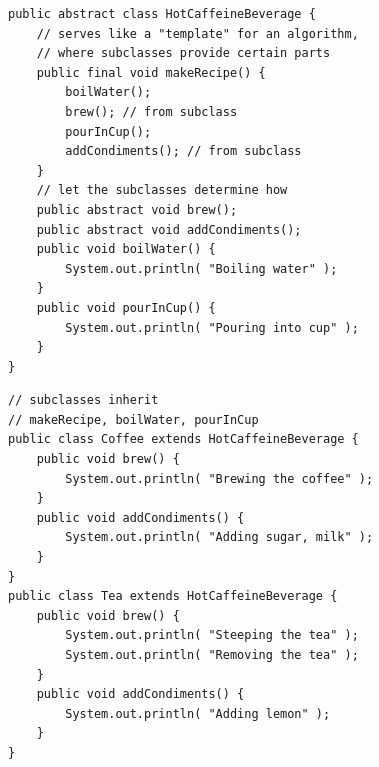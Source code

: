 \documentclass[8pt, letterpaper, titlepage]{article}
\begin{document}
\begin{multicols*}{2}
    \begin{lstlisting}
public abstract class HotCaffeineBeverage {
    // serves like a "template" for an algorithm,
    // where subclasses provide certain parts
    public final void makeRecipe() {
        boilWater();
        brew(); // from subclass
        pourInCup();
        addCondiments(); // from subclass
    }
    // let the subclasses determine how
    public abstract void brew();
    public abstract void addCondiments();
    public void boilWater() {
        System.out.println( "Boiling water" );
    }
    public void pourInCup() {
        System.out.println( "Pouring into cup" );
    }
}           
    \end{lstlisting}

    \begin{lstlisting}
// subclasses inherit
// makeRecipe, boilWater, pourInCup
public class Coffee extends HotCaffeineBeverage {
    public void brew() {
        System.out.println( "Brewing the coffee" );
    }
    public void addCondiments() {
        System.out.println( "Adding sugar, milk" );
    }
}
public class Tea extends HotCaffeineBeverage {
    public void brew() {
        System.out.println( "Steeping the tea" );
        System.out.println( "Removing the tea" );
    }
    public void addCondiments() {
        System.out.println( "Adding lemon" );
    }
}
                
    \end{lstlisting}

\end{multicols*}
\newpage
\end{document}
